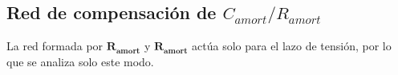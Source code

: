 \subsection{Red de compensación de $C_{amort}/R_{amort}$}

La red formada por $\bm{R_{amort}}$ y $\bm{R_{amort}}$ actúa solo para el lazo de tensión, por lo que se analiza solo este modo.







\clearpage



